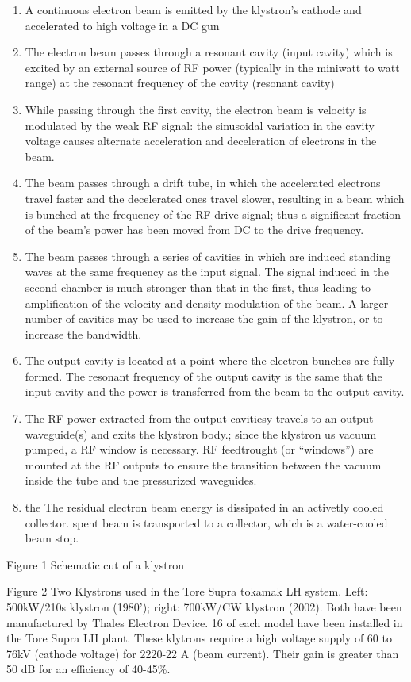 \begin{enumerate}
 \item  A continuous electron beam is emitted by the klystron's cathode and accelerated to high voltage in a DC gun 
 \item The electron beam passes through a resonant cavity (input cavity) which is excited by an external source of RF power (typically in the miniwatt to watt range) at the resonant frequency of the cavity (resonant cavity) 
\item While passing through the first cavity, the electron beam is velocity is modulated by the weak RF signal: the sinusoidal variation in the cavity voltage causes alternate acceleration and deceleration of electrons in the beam. 
\item The beam passes through a drift tube, in which the accelerated electrons travel faster and the decelerated ones travel slower, resulting in a beam which is bunched at the frequency of the RF drive signal; thus a significant fraction of the beam’s power has been moved from DC to the drive frequency. 
\item The beam passes through a series of cavities in which are induced standing waves at the same frequency as the input signal. The signal induced in the second chamber is much stronger than that in the first, thus leading to amplification of the velocity and density modulation of the beam. A larger number of cavities may be used to increase the gain of the klystron, or to increase the bandwidth. 
\item The output cavity is located at a point where the electron bunches are fully formed. The resonant frequency of the output cavity is the same that the input cavity and the power is transferred from the beam to the output cavity. 
\item The RF power extracted from the output cavitiesy travels to an output waveguide(s) and exits the klystron body.;  since the klystron us vacuum pumped, a RF window is necessary. RF feedtrought (or “windows”) are mounted at the RF outputs to ensure the transition between the vacuum inside the tube and the pressurized waveguides.
\item the The residual electron beam energy is dissipated in an activetly cooled collector. spent beam is transported to a collector, which is a water-cooled beam stop. 
\end{enumerate}

Figure 1 Schematic cut of a klystron


Figure 2 Two Klystrons used in the Tore Supra tokamak LH system. Left: 500kW/210s klystron (1980'); right: 700kW/CW klystron (2002). Both have been manufactured by Thales Electron Device. 16 of each model have been installed in the Tore Supra LH plant. These klytrons require a high voltage supply of 60 to 76kV (cathode voltage) for 2220-22 A (beam current). Their gain is greater than 50 dB for an efficiency of 40-45\%.

